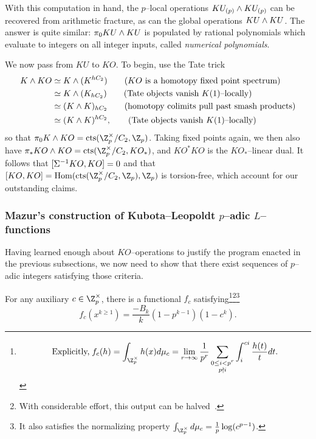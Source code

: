 \begin{remark}
With this computation in hand, the $p$--local operations $KU_{(p)} \wedge KU_{(p)}$ can be recovered from arithmetic fracture, as can the global operations $KU \wedge KU$.  The answer is quite similar: $\pi_0 KU \wedge KU$ is populated by rational polynomials which evaluate to integers on all integer inputs, called \textit{numerical polynomials}.
\end{remark}

We now pass from $KU$ to $KO$.  To begin, use the Tate trick
\begin{align*}
K \wedge KO & \simeq K \wedge (K^{hC_2}) \tag{$KO$ is a homotopy fixed point spectrum} \\
& \simeq K \wedge (K_{hC_2}) \tag{Tate objects vanish $K(1)$--locally} \\
& \simeq (K \wedge K)_{hC_2} \tag{homotopy colimits pull past smash products} \\
& \simeq (K \wedge K)^{hC_2}, \tag{Tate objects vanish $K(1)$--locally}
\end{align*}
so that $\pi_0 K \sm KO = \cts(\Z_p^\times / C_2, \Z_p)$.  Taking fixed points again, we then also have $\pi_* KO \sm KO = \cts(\Z_p^\times / C_2, KO_*)$, and $KO^* KO$ is the $KO_*$--linear dual.  It follows that $[\Sigma^{-1} KO, KO] = 0$ and that $[KO, KO] = \Hom(\cts(\Z_p^\times / C_2, \Z_p), \Z_p)$ is torsion-free, which account for our outstanding claims.


\subsubsection{Mazur's construction of Kubota--Leopoldt $p$--adic $L$--functions}

Having learned enough about $KO$--operations to justify the program enacted in the previous subsections, we now need to show that there exist sequences of $p$--adic integers satisfying those criteria.

\begin{theorem}[Mazur]
For any auxiliary $c \in \Z_p^\times$, there is a functional $f_c$ satisfying\footnote{\[\text{Explicitly,\;} f_c(h) = \int_{\Z_p^\times} h(x) d\mu_c = \lim_{r \to \infty} \frac{1}{p^r} \sum_{\substack{0 \le i < p^r \\ p \nmid i}} \int_i^{ci} \frac{h(t)}{t} dt.\]}\footnote{With considerable effort, this output can be halved~\cite[Section 10.3]{AHR}.}\footnote{It also satisfies the normalizing property $\int_{\Z_p^\times} d\mu_c = \frac{1}{p} \log(c^{p-1})$.} \[f_c(x^{k \ge 1}) = \frac{-B_k}{k}(1 - p^{k-1})(1 - c^k).\]
\end{theorem}

